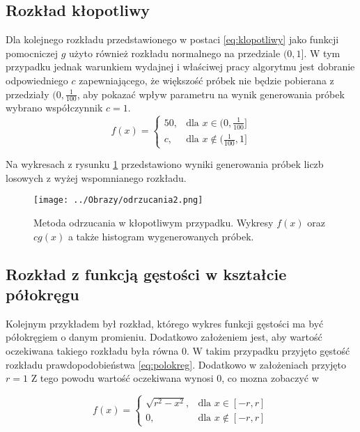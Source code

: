 \documentclass[12pt,a4paper]{article}
\begin{document}
\subsection{Rozkład kłopotliwy}
Dla kolejnego rozkładu przedstawionego w postaci \ref{eq:klopotliwy} jako funkcji pomocniczej $g$ użyto również rozkładu normalnego na przedziale $(0,1]$.
W tym przypadku jednak warunkiem wydajnej i właściwej pracy algorytmu jest dobranie odpowiedniego $c$ zapewniającego, że większość próbek nie będzie pobierana z przedziały $(0,\frac{1}{100}$, aby pokazać wpływ parametru na wynik generowania próbek wybrano współczynnik $c=1$.
\begin{equation}\label{eq:klopotliwy}
f(x) = \begin{cases} 50, & \mbox{dla } x \in (0,\frac{1}{100}] \\ c , & \mbox{dla } x \not\in (\frac{1}{100},1] \end{cases}
\end{equation}

Na wykresach z rysunku \ref{fig:odrzucania2} przedstawiono wyniki generowania próbek liczb losowych z wyżej wspomnianego rozkładu.

\begin{figure}[H]
\centering
\texttt{[image: ../Obrazy/odrzucania2.png]} 
\caption{Metoda odrzucania w kłopotliwym przypadku. Wykresy $f(x)$ oraz $cg(x)$ a także histogram wygenerowanych próbek.}
\label{fig:odrzucania2}
\end{figure}

\subsection{Rozkład z funkcją gęstości w kształcie półokręgu}
Kolejnym przykładem był rozkład, którego wykres funkcji gęstości ma być półokręgiem o danym promieniu.
Dodatkowo założeniem jest, aby wartość oczekiwana takiego rozkładu była równa 0.
W takim przypadku przyjęto gęstość rozkładu prawdopodobieństwa \ref{eq:polokreg}.
Dodatkowo w założeniach przyjęto $r=1$
Z tego powodu wartość oczekiwana wynosi $0$, co mozna zobaczyć w 

\begin{equation}\label{eq:polokreg}
f(x) = \begin{cases} \sqrt{r^{2} - x^{2}}, & \mbox{dla } x \in [-r,r] \\ 0 , & \mbox{dla } x \not\in [-r,r] \end{cases}
\end{equation}
\end{document}
